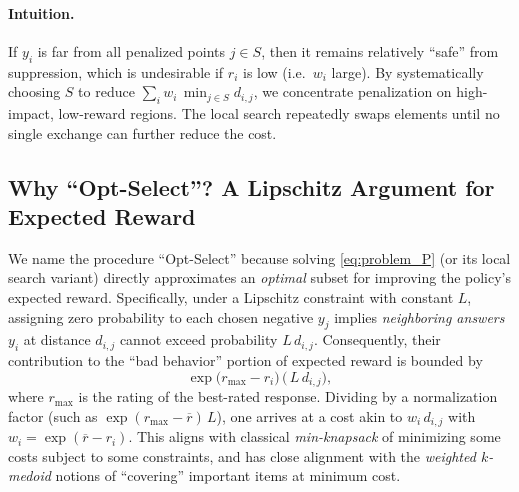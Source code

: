 \paragraph{Intuition.}
If $y_i$ is far from all penalized points $j\in S$, then it remains relatively “safe” from suppression, which is undesirable if $r_i$ is low (i.e.\ $w_i$ large). By systematically choosing $S$ to reduce $\sum_i w_i\,\min_{j\in S}d_{i,j}$, we concentrate penalization on high-impact, low-reward regions. The local search repeatedly swaps elements until no single exchange can further reduce the cost.

\subsection{Why ``Opt-Select''? A Lipschitz Argument for Expected Reward}

We name the procedure ``Opt-Select'' because solving \eqref{eq:problem_P} (or its local search variant) directly approximates an \emph{optimal} subset for improving the policy's expected reward. Specifically, under a Lipschitz constraint with constant $L$, assigning zero probability to each chosen negative $y_j$ implies \emph{neighboring answers} $y_i$ at distance $d_{i,j}$ cannot exceed probability $L\,d_{i,j}$. Consequently, their contribution to the ``bad behavior'' portion of expected reward is bounded by
\[
   \exp\bigl(r_{\max} - r_i\bigr)\,\bigl(\,L\,d_{i,j}\bigr),
\]
where $r_{\max}$ is the rating of the best-rated response. Dividing by a normalization factor (such as $\exp(r_{\max} - \overline{r})\,L$), one arrives at a cost akin to $w_i\, d_{i,j}$ with $w_i = \exp(\overline{r}-r_i)$. 
This aligns with classical \emph{min-knapsack} of minimizing some costs subject to some constraints, and has close alignment with the \emph{weighted $k$-medoid} notions of “covering” important items at minimum cost. %
